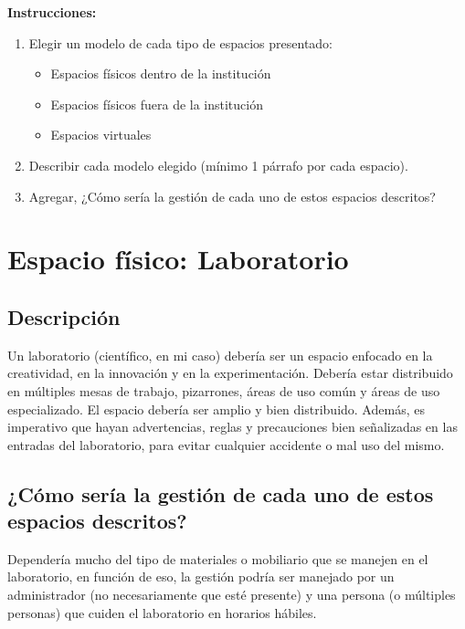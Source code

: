 




\textbf{Instrucciones:}\bigbreak

\begin{enumerate}
    \item Elegir un modelo de cada tipo de espacios presentado: 
    \begin{itemize}
        \item Espacios físicos dentro de la institución
        \item Espacios físicos fuera de la institución
        \item Espacios virtuales
    \end{itemize}

    \item Describir cada modelo elegido  (mínimo 1 párrafo por cada espacio).
    \item Agregar, ¿Cómo sería la gestión de cada uno de estos espacios descritos?
    
\end{enumerate}

\section{Espacio físico: Laboratorio}
\subsection{Descripción}
Un laboratorio (científico, en mi caso) debería ser un espacio enfocado en la creatividad, en la innovación y en la experimentación. Debería estar distribuido en múltiples mesas de trabajo, pizarrones, áreas de uso común y áreas de uso especializado. El espacio debería ser amplio y bien distribuido. Además, es imperativo que hayan advertencias, reglas y precauciones bien señalizadas en las entradas del laboratorio, para evitar cualquier accidente o mal uso del mismo. 

\subsection{¿Cómo sería la gestión de cada uno de estos espacios descritos?}

Dependería mucho del tipo de materiales o mobiliario que se manejen en el laboratorio, en función de eso, la gestión podría ser manejado por un administrador (no necesariamente que esté presente) y una persona (o múltiples personas) que cuiden el laboratorio en horarios hábiles.


